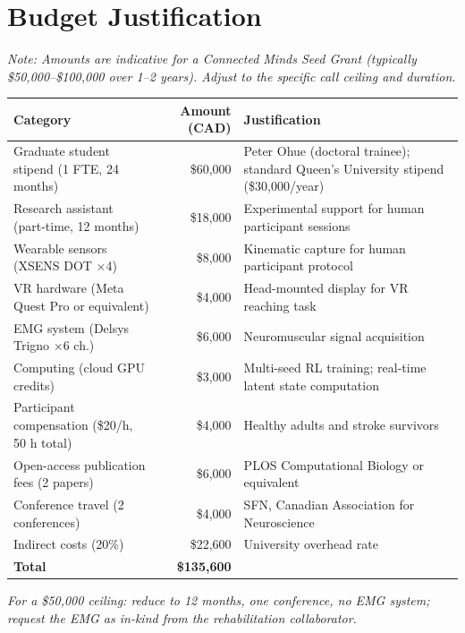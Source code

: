 \documentclass[12pt]{article}
\begin{document}
\section{Budget Justification}

\textit{Note: Amounts are indicative for a Connected Minds Seed Grant
(typically \$50{,}000--\$100{,}000 over 1--2 years).
Adjust to the specific call ceiling and duration.}

\begin{tabularx}{\linewidth}{@{}lrX@{}}
\toprule
\textbf{Category} & \textbf{Amount (CAD)} & \textbf{Justification} \\
\midrule
Graduate student stipend (1 FTE, 24 months) & \$60{,}000 & Peter Ohue (doctoral trainee); standard Queen's University stipend (\$30{,}000/year) \\
Research assistant (part-time, 12 months)   & \$18{,}000 & Experimental support for human participant sessions \\
Wearable sensors (XSENS DOT $\times$4)      & \$8{,}000  & Kinematic capture for human participant protocol \\
VR hardware (Meta Quest Pro or equivalent)  & \$4{,}000  & Head-mounted display for VR reaching task \\
EMG system (Delsys Trigno $\times$6 ch.)    & \$6{,}000  & Neuromuscular signal acquisition \\
Computing (cloud GPU credits)               & \$3{,}000  & Multi-seed RL training; real-time latent state computation \\
Participant compensation (\$20/h, 50 h total) & \$4{,}000 & Healthy adults and stroke survivors \\
Open-access publication fees (2 papers)     & \$6{,}000  & PLOS Computational Biology or equivalent \\
Conference travel (2 conferences)           & \$4{,}000  & SFN, Canadian Association for Neuroscience \\
Indirect costs (20\%)                       & \$22{,}600 & University overhead rate \\
\midrule
\textbf{Total}                              & \textbf{\$135{,}600} & \\
\bottomrule
\end{tabularx}

\textit{For a \$50{,}000 ceiling: reduce to 12 months, one conference,
no EMG system; request the EMG as in-kind from the rehabilitation
collaborator.}
\end{document}
